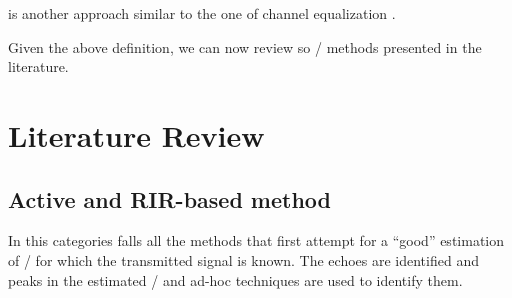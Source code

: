  is another approach similar to the one of channel equalization .

Given the above definition, we can now review so \AER/ methods presented in the literature.

\section{Literature Review}

\subsection{Active and RIR-based method}
In this categories falls all the methods that first attempt for a ``good'' estimation of \RIRs/ for which the transmitted signal is known.
The echoes are identified and peaks in the estimated \RIRs/ and ad-hoc techniques are used to identify them.

